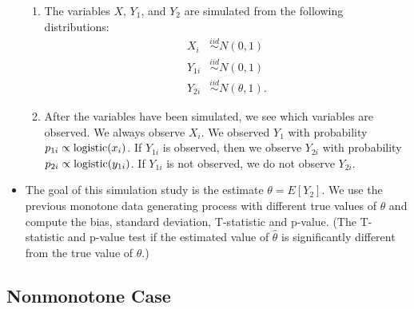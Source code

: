 \begin{itemize}
    \begin{enumerate}
      \item The variables $X$, $Y_1$, and $Y_2$ are simulated from the following
        distributions:
        \begin{align*}
          X_i &\stackrel{iid}{\sim} N(0, 1) \\
          Y_{1i} &\stackrel{iid}{\sim} N(0, 1) \\
          Y_{2i} &\stackrel{iid}{\sim} N(\theta, 1).
        \end{align*}

      \item After the variables have been simulated, we see which variables are
        observed. We always observe $X_i$. We observed $Y_1$ with
        probability $p_{1i} \propto {\text{logistic}}(x_i)$. If $Y_{1i}$ is observed,
        then we observe $Y_{2i}$ with probability $p_{2i} \propto
        {\text{logistic}}(y_{1i})$. If $Y_{1i}$ is not observed, we do not observe
        $Y_{2i}$.
    \end{enumerate}

  \item The goal of this simulation study is the estimate $\theta = E[Y_2]$. We
    use the previous monotone data generating process with different true values
    of $\theta$ and compute the bias, standard deviation, T-statistic and
    p-value. (The T-statistic and p-value test if the estimated value of $\hat
    \theta$ is significantly different from the true value of $\theta$.)

    
    
    

\end{itemize}

\newpage

\subsection*{Nonmonotone Case}

